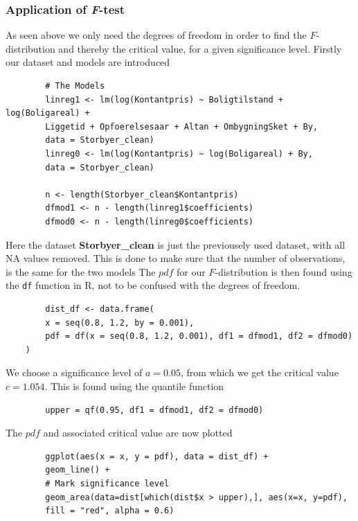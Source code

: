 \subsubsection{Application of \textit{F}-test}
    As seen above we only need the degrees of freedom in order to find the $F$-distribution and thereby the critical value, for a given significance level.
    Firstly our dataset and models are introduced
    
    \begin{lstlisting}
        # The Models
        linreg1 <- lm(log(Kontantpris) ~ Boligtilstand + log(Boligareal) + 
        Liggetid + Opfoerelsesaar + Altan + OmbygningSket + By,
        data = Storbyer_clean)
        linreg0 <- lm(log(Kontantpris) ~ log(Boligareal) + By, 
        data = Storbyer_clean)
        
        n <- length(Storbyer_clean$Kontantpris)
        dfmod1 <- n - length(linreg1$coefficients)
        dfmod0 <- n - length(linreg0$coefficients)
    \end{lstlisting}
    
    Here the dataset \textbf{Storbyer\_clean} is just the previousely used dataset, with all NA values removed. This is done to make sure that the number of observations, is the same for the two models
    The $pdf$ for our $F$-distribution is then found using the \texttt{df} function in R, not to be confused with the degrees of freedom. 
    
    \begin{lstlisting}
        dist_df <- data.frame(
        x = seq(0.8, 1.2, by = 0.001),
        pdf = df(x = seq(0.8, 1.2, 0.001), df1 = dfmod1, df2 = dfmod0)
    )
    \end{lstlisting}
    
    We choose a significance level of $a = 0.05$, from which we get the critical value $c=1.054$. 
    This is found using the quantile function
    
    \begin{lstlisting}
        upper = qf(0.95, df1 = dfmod1, df2 = dfmod0)
    \end{lstlisting}
    
    The $pdf$ and associated critical value are now plotted
    
    \begin{lstlisting}
        ggplot(aes(x = x, y = pdf), data = dist_df) + 
        geom_line() +
        # Mark significance level
        geom_area(data=dist[which(dist$x > upper),], aes(x=x, y=pdf), 
        fill = "red", alpha = 0.6)
    \end{lstlisting}
    
